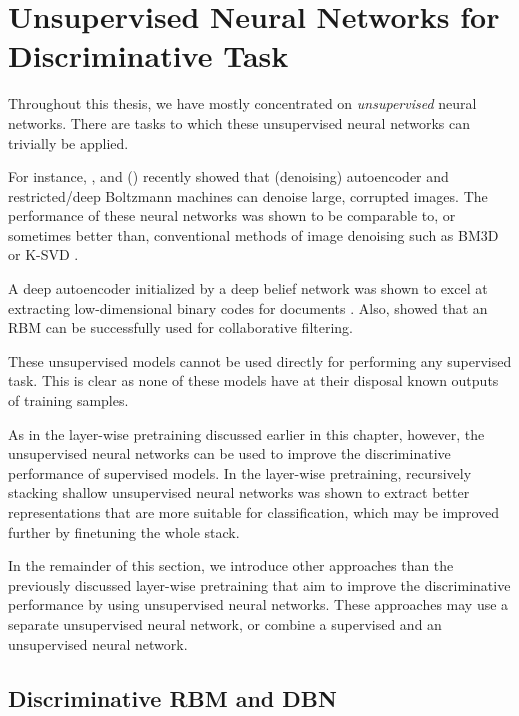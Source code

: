 \documentclass[dissertation,nocontribution]{aaltoseries}
\begin{document}
\section{Unsupervised Neural Networks for Discriminative
Task}
\label{sec:dunn}

Throughout this thesis, we have mostly concentrated on
\textit{unsupervised} neural networks.  There are 
tasks to which these unsupervised neural networks can
trivially be applied.

For instance, \citet{Burger2012}, \citet{Xie2012} and
\citet{Cho2013} () 
recently showed
that (denoising) autoencoder and restricted/deep Boltzmann
machines can denoise large, corrupted images.  The
performance of these neural networks was shown to be
comparable to, or sometimes better than, conventional
methods of image denoising such as BM3D \citep{Dabov2007} or
K-SVD \citep{Portilla2003}.  

A deep autoencoder initialized by a deep belief network
was shown to excel at extracting low-dimensional binary
codes for documents \citep{Salakhutdinov2009s}.  Also,
\citet{Salakhutdinov2007} showed that an RBM can be
successfully used for collaborative filtering. 

These unsupervised models cannot be used directly for performing
any supervised task. This is clear as none of these models have
at their disposal known outputs of training samples.

As in the layer-wise pretraining discussed earlier in this
chapter, however, the unsupervised neural networks can be
used to improve the discriminative performance of 
supervised models. In the layer-wise pretraining,
recursively stacking shallow unsupervised neural networks
was shown to extract better representations that are more
suitable for classification, which may be improved further by
finetuning the whole stack.%

In the remainder of this section, we introduce other approaches
than the previously discussed layer-wise pretraining
that aim to improve the discriminative performance by
using unsupervised neural networks. These approaches
may use a separate unsupervised neural network, or combine a
supervised and an unsupervised neural network.

\subsection{Discriminative RBM and DBN}
\label{sec:drbm}
\end{document}
